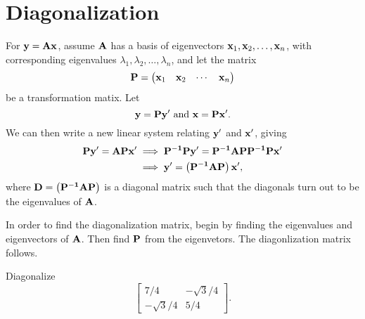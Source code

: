\section{Diagonalization}
For $\bold{y} = \bold{A} \bold{x}$, assume $\bold{A}$ has
a basis of eigenvectors $\bold{x}_1,\bold{x}_2, \dots,
\bold{x}_n$, with corresponding eigenvalues $\lambda_1, \lambda_2, \dots, \lambda_n$, and let
the matrix $$\bold{P} = \begin{pmatrix} \bold{x}_1 & \bold{x}_2 & \cdots & \bold{x}_n \end{pmatrix}$$ be a transformation matix.
Let $$\bold{y} = \bold{P} \bold{y}' ~ \text{and} ~ \bold{x} = \bold{P} \bold{x}'.$$
We can then write a new linear system relating $\bold{y}'$ and $\bold{x}'$, giving
\begin{align*}
    \bold{P}\bold{y}' = \bold{A}\bold{P} \bold{x}' &\implies \bold{P^{-1}}\bold{P}\bold{y}' = \bold{P^{-1}}\bold{A}\bold{P}\bold{P^{-1}}\bold{P}\bold{x}' \\
&\implies \bold{y}' = \left ( \bold{P^{-1}}\bold{A}\bold{P} \right) \bold{x}',
\end{align*}
where $ \bold{D} = \left ( \bold{P^{-1}}\bold{A}\bold{P} \right) $ is a diagonal matrix such that the diagonals turn out to be the eigenvalues of $\bold{A}$.

\begin{remark}
    In order to find the diagonalization matrix, begin by finding the eigenvalues and eigenvectors of $\bold{A}$. Then find $\bold{P}$ from the eigenvetors. The diagonlization matrix follows.
\end{remark}

\begin{example}
    Diagonalize $$\begin{bmatrix} 7/4 & -\sqrt{3}/4 \\ -\sqrt{3}/4 & 5/4 \end{bmatrix}.$$
\end{example}

